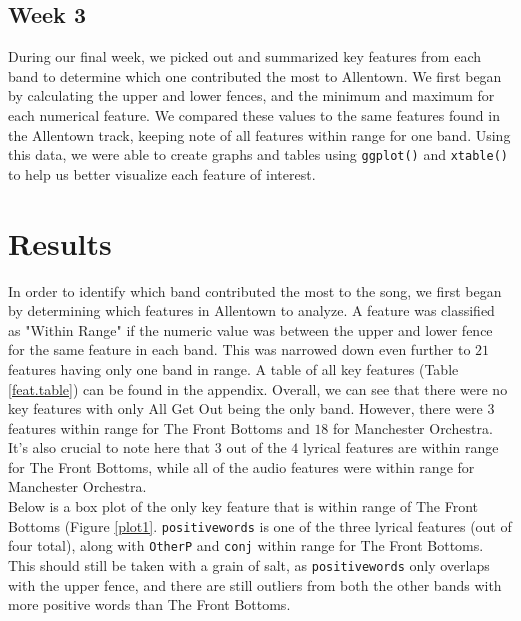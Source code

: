 \documentclass{article}\usepackage[]{graphicx}\usepackage[]{xcolor}
\begin{document}
\begin{multicols}{2}
\subsection{Week 3}
During our final week, we picked out and summarized key features from each band to determine which one contributed the most to Allentown. We first began by calculating the upper and lower fences, and the minimum and maximum for each numerical feature. We compared these values to the same features found in the Allentown track, keeping note of all features within range for one band. Using this data, we were able to create graphs and tables using \verb|ggplot()| and \verb|xtable()| to help us better visualize each feature of interest. 
\section{Results}
In order to identify which band contributed the most to the song, we first began by determining which features in Allentown to analyze. A feature was classified as "Within Range" if the numeric value was between the upper and lower fence for the same feature in each band. This was narrowed down even further to $21$ features having only one band in range. A table of all key features (Table \ref{feat.table}) can be found in the appendix. Overall, we can see that there were no key features with only All Get Out being the only band. However, there were $3$ features within range for The Front Bottoms and $18$ for Manchester Orchestra. It's also crucial to note here that $3$ out of the $4$ lyrical features are within range for The Front Bottoms, while all of the audio features were within range for Manchester Orchestra. \\
\indent Below is a box plot of the only key feature that is within range of The Front Bottoms (Figure \ref{plot1}. \texttt{positivewords} is one of the three lyrical features (out of four total), along with \texttt{OtherP} and \texttt{conj} within range for The Front Bottoms. This should still be taken with a grain of salt, as \texttt{positivewords} only overlaps with the upper fence, and there are still outliers from both the other bands with more positive words than The Front Bottoms.


\end{multicols}
\end{document}
